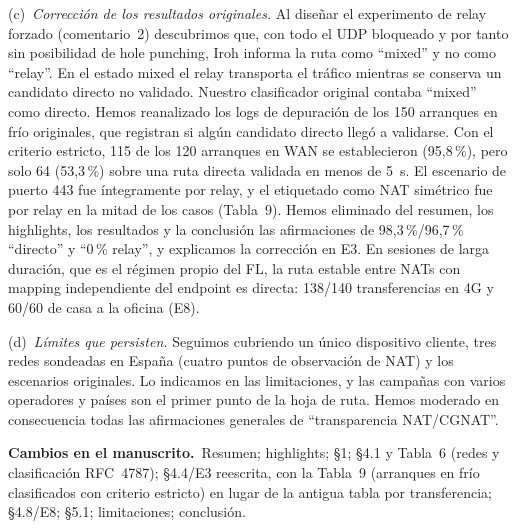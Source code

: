 \documentclass[11pt,a4paper]{article}
\newcommand{\changes}{\par\smallskip\noindent\textbf{Cambios en el manuscrito.}~}
\begin{document}
(c)~\emph{Corrección de los resultados originales.} Al diseñar el experimento de relay forzado (comentario~2) descubrimos que, con todo el UDP bloqueado y por tanto sin posibilidad de hole punching, Iroh informa la ruta como ``mixed'' y no como ``relay''. En el estado mixed el relay transporta el tráfico mientras se conserva un candidato directo no validado. Nuestro clasificador original contaba ``mixed'' como directo. Hemos reanalizado los logs de depuración de los 150 arranques en frío originales, que registran si algún candidato directo llegó a validarse. Con el criterio estricto, 115 de los 120 arranques en WAN se establecieron (95,8\,\%), pero solo 64 (53,3\,\%) sobre una ruta directa validada en menos de 5~s. El escenario de puerto 443 fue íntegramente por relay, y el etiquetado como NAT simétrico fue por relay en la mitad de los casos (Tabla~9). Hemos eliminado del resumen, los highlights, los resultados y la conclusión las afirmaciones de 98,3\,\%/96,7\,\% ``directo'' y ``0\,\% relay'', y explicamos la corrección en E3. En sesiones de larga duración, que es el régimen propio del FL, la ruta estable entre NATs con mapping independiente del endpoint es directa: 138/140 transferencias en 4G y 60/60 de casa a la oficina (E8).

(d)~\emph{Límites que persisten.} Seguimos cubriendo un único dispositivo cliente, tres redes sondeadas en España (cuatro puntos de observación de NAT) y los escenarios originales. Lo indicamos en las limitaciones, y las campañas con varios operadores y países son el primer punto de la hoja de ruta. Hemos moderado en consecuencia todas las afirmaciones generales de ``transparencia NAT/CGNAT''.

\changes Resumen; highlights; \S1; \S4.1 y Tabla~6 (redes y clasificación RFC~4787); \S4.4/E3 reescrita, con la Tabla~9 (arranques en frío clasificados con criterio estricto) en lugar de la antigua tabla por transferencia; \S4.8/E8; \S5.1; limitaciones; conclusión.
\end{document}
